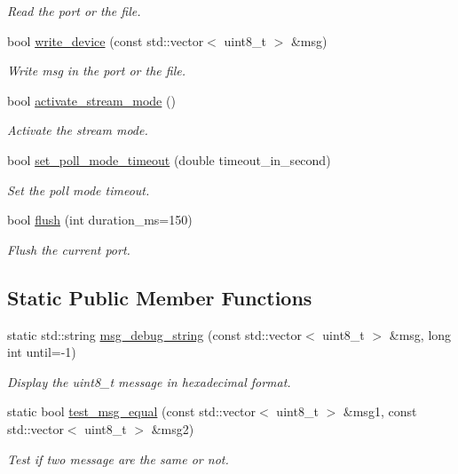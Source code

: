 \begin{DoxyCompactItemize}
\begin{DoxyCompactList}\small\item\em Read the port or the file. \end{DoxyCompactList}\item 
bool \hyperlink{classreal__time__tools_1_1UsbStream_aa9fdd0d43fbf0cddbffb65538af60321}{write\+\_\+device} (const std\+::vector$<$ uint8\+\_\+t $>$ \&msg)
\begin{DoxyCompactList}\small\item\em Write msg in the port or the file. \end{DoxyCompactList}\item 
bool \hyperlink{classreal__time__tools_1_1UsbStream_a6e13bacd3b24a8e60b27cbcefefdb3f4}{activate\+\_\+stream\+\_\+mode} ()
\begin{DoxyCompactList}\small\item\em Activate the stream mode. \end{DoxyCompactList}\item 
bool \hyperlink{classreal__time__tools_1_1UsbStream_a1c61741541acfca7ecf6deaf0b8ad1fc}{set\+\_\+poll\+\_\+mode\+\_\+timeout} (double timeout\+\_\+in\+\_\+second)
\begin{DoxyCompactList}\small\item\em Set the poll mode timeout. \end{DoxyCompactList}\item 
bool \hyperlink{classreal__time__tools_1_1UsbStream_a0bc5fb5783f1833341d55b9b013be6c6}{flush} (int duration\+\_\+ms=150)
\begin{DoxyCompactList}\small\item\em Flush the current port. \end{DoxyCompactList}\end{DoxyCompactItemize}
\subsection*{Static Public Member Functions}
\begin{DoxyCompactItemize}
\item 
static std\+::string \hyperlink{classreal__time__tools_1_1UsbStream_ac98f3cad23dbc85f47405c3809a22198}{msg\+\_\+debug\+\_\+string} (const std\+::vector$<$ uint8\+\_\+t $>$ \&msg, long int until=-\/1)
\begin{DoxyCompactList}\small\item\em Display the uint8\+\_\+t message in hexadecimal format. \end{DoxyCompactList}\item 
static bool \hyperlink{classreal__time__tools_1_1UsbStream_ae3e565f6ea54fb5c4666b98745e9f87f}{test\+\_\+msg\+\_\+equal} (const std\+::vector$<$ uint8\+\_\+t $>$ \&msg1, const std\+::vector$<$ uint8\+\_\+t $>$ \&msg2)
\begin{DoxyCompactList}\small\item\em Test if two message are the same or not. \end{DoxyCompactList}\end{DoxyCompactItemize}
